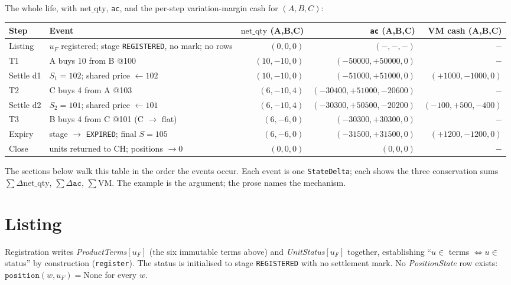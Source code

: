 \documentclass[11pt]{article}
\newcommand{\ac}{\texttt{ac}}
\newcommand{\netq}{\mathrm{net\_qty}}
\newcommand{\code}[1]{\texttt{#1}}
\newcommand{\unit}{u_{F}}
\begin{document}
\noindent The whole life, with $\netq$, \ac, and the per-step variation-margin cash for $(A,B,C)$:

\begin{center}\small
\begin{longtable}{@{}llrrr@{}}
\toprule
Step & Event & $\netq$ (A,B,C) & \ac{} (A,B,C) & VM cash (A,B,C) \\
\midrule
\endhead
Listing    & $\unit$ registered; stage \code{REGISTERED}, no mark; no rows & $(0,0,0)$ & $(-,-,-)$ & $-$ \\
T1         & A buys 10 from B @100                       & $(10,-10,0)$ & $(-50000,+50000,0)$ & $-$ \\
Settle d1  & $S_1=102$; shared price $\leftarrow 102$    & $(10,-10,0)$ & $(-51000,+51000,0)$ & $(+1000,-1000,0)$ \\
T2         & C buys 4 from A @103                        & $(6,-10,4)$  & $(-30400,+51000,-20600)$ & $-$ \\
Settle d2  & $S_2=101$; shared price $\leftarrow 101$    & $(6,-10,4)$  & $(-30300,+50500,-20200)$ & $(-100,+500,-400)$ \\
T3         & B buys 4 from C @101 (C $\to$ flat)         & $(6,-6,0)$   & $(-30300,+30300,0)$ & $-$ \\
Expiry     & stage $\to$ \code{EXPIRED}; final $S=105$   & $(6,-6,0)$   & $(-31500,+31500,0)$ & $(+1200,-1200,0)$ \\
Close      & units returned to CH; positions $\to 0$     & $(0,0,0)$    & $(0,0,0)$ & $-$ \\
\bottomrule
\end{longtable}
\end{center}

\noindent The sections below walk this table in the order the events occur. Each event is one
\code{StateDelta}; each shows the three conservation sums $\sum\Delta\netq$, $\sum\Delta\ac$,
$\sum\mathrm{VM}$. The example is the argument; the prose names the mechanism.

\section{Listing}

Registration writes \emph{ProductTerms}$[\unit]$ (the six immutable terms above) and
\emph{UnitStatus}$[\unit]$ together, establishing ``$u\in$ terms $\iff u\in$ status'' by
construction (\code{register}). The status is initialised to stage \code{REGISTERED} with no
settlement mark. No \emph{PositionState} row exists: $\code{position}(w,\unit)=\mathrm{None}$ for
every $w$.
\end{document}
